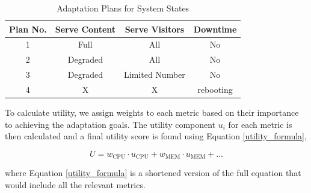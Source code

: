 \documentclass[conference]{IEEEtran}
\begin{document}
\begin{itemize}
\begin{itemize}
              \begin{table}[ht]
                \centering
                \caption{Adaptation Plans for System States}
                \label{tab:adaptation-plans}
                \small
                \begin{tabular}{cccc}
                \toprule
                \textbf{Plan No.} & \textbf{Serve Content} & \textbf{Serve Visitors} & \textbf{Downtime} \\
                \midrule
                1 & Full & All & No \\
                2 & Degraded & All & No \\
                3 & Degraded & Limited Number & No \\
                4 & X & X & rebooting \\
                \bottomrule
                \end{tabular}
                \end{table}

                To calculate utility, we assign weights to each metric based on their importance to achieving the adaptation goals. The utility component \( u_i \) for each metric is then calculated and a final utility score is found using Equation \ref{utility_formula},

                \begin{equation}
                U = w_{\text{CPU}} \cdot u_{\text{CPU}} + w_{\text{MEM}} \cdot u_{\text{MEM}}+ ...
                \label{utility_formula}
                \end{equation}

                where Equation \ref{utility_formula} is a shortened version of the full equation that would include all the relevant metrics.
                

\end{itemize}
\end{itemize}
\end{document}
